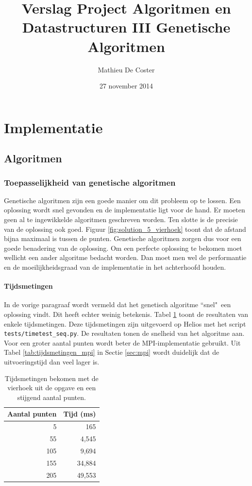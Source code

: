 \documentclass[titlepage,a4paper]{article}
\begin{document}
\title{Verslag Project Algoritmen en Datastructuren III Genetische Algoritmen}
\author{Mathieu De Coster}
\date{27 november 2014}
\maketitle

\section{Implementatie}
\subsection{Algoritmen}
\subsubsection{Toepasselijkheid van genetische algoritmen}
Genetische algoritmen zijn een goede manier om dit probleem op te lossen. Een oplossing wordt snel gevonden en de implementatie ligt voor de hand. Er moeten geen al te ingewikkelde algoritmen geschreven worden. Ten slotte is de precisie van de oplossing ook goed. Figuur \ref{fig:solution_5_vierhoek} toont dat de afstand bijna maximaal is tussen de punten. Genetische algoritmen zorgen dus voor een goede benadering van de oplossing. Om een perfecte oplossing te bekomen moet wellicht een ander algoritme bedacht worden. Dan moet men wel de performantie en de moeilijkheidsgraad van de implementatie in het achterhoofd houden.

\paragraph{Tijdsmetingen} In de vorige paragraaf wordt vermeld dat het genetisch algoritme ``snel"\ een oplossing vindt. Dit heeft echter weinig betekenis. Tabel \ref{tab:tijdsmetingen_seq} toont de resultaten van enkele tijdsmetingen. Deze tijdsmetingen zijn uitgevoerd op Helios met het script \texttt{tests/timetest\_seq.py}. De resultaten tonen de snelheid van het algoritme aan. Voor een groter aantal punten wordt beter de MPI-implementatie gebruikt. Uit Tabel \ref{tab:tijdsmetingen_mpi} in Sectie \ref{sec:mpi} wordt duidelijk dat de uitvoeringstijd dan veel lager is.

\begin{table}[here]
\caption{Tijdsmetingen bekomen met de vierhoek uit de opgave en een stijgend aantal punten.}
\label{tab:tijdsmetingen_seq}
\centering
\begin{tabular}{|r|r|}
\hline
Aantal punten & Tijd (ms) \\
\hline
5 & 165 \\
55 & 4,545 \\
105 & 9,694 \\
155 & 34,884 \\
205 & 49,553 \\
\hline
\end{tabular}
\end{table}
\end{document}

